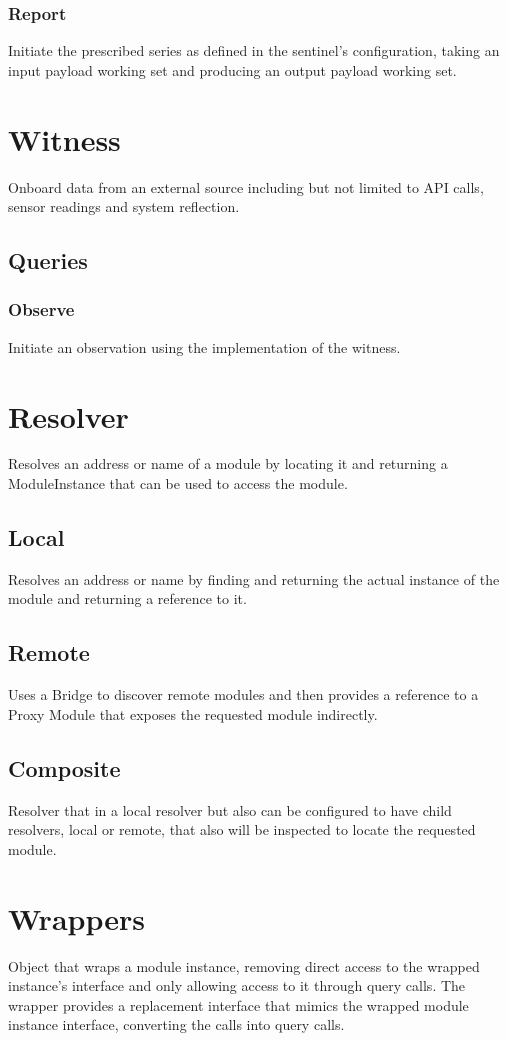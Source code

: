 \documentclass{article}
\begin{document}
\subsubsection{Report}
Initiate the prescribed series as defined in the sentinel's configuration, taking an input payload working set and producing an output payload working set.

\section{Witness}
Onboard data from an external source including but not limited to API calls, sensor readings and system reflection.
\subsection{Queries}
\subsubsection{Observe}
Initiate an observation using the implementation of the witness.

\section{Resolver}
Resolves an address or name of a module by locating it and returning a ModuleInstance that can be used to access the module.
\subsection{Local}
Resolves an address or name by finding and returning the actual instance of the module and returning a reference to it.
\subsection{Remote}
Uses a Bridge to discover remote modules and then provides a reference to a Proxy Module that exposes the requested module indirectly.
\subsection{Composite}
Resolver that in a local resolver but also can be configured to have child resolvers, local or remote, that also will be inspected to locate the requested module.


\section{Wrappers}
Object that wraps a module instance, removing direct access to the wrapped instance's interface and only allowing access to it through query calls.  The wrapper provides a replacement interface that mimics the wrapped module instance interface, converting the calls into query calls.
\end{document}
